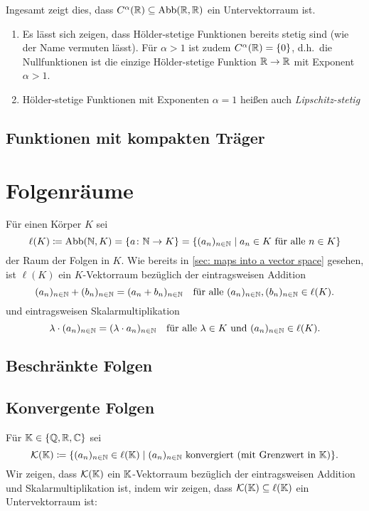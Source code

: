 Ingesamt zeigt dies, dass $C^\alpha(\mathbb{R}) \subseteq \mathrm{Abb}(\mathbb{R}, \mathbb{R})$ ein Untervektorraum ist.

\begin{bem}
 \begin{enumerate}[leftmargin=*]
  \item
   Es lässt sich zeigen, dass Hölder-stetige Funktionen bereits stetig sind (wie der Name vermuten lässt). Für $\alpha > 1$ ist zudem $C^\alpha(\mathbb{R}) = \{0\}$, d.h.\ die Nullfunktionen ist die einzige Hölder-stetige Funktion $\mathbb{R} \to \mathbb{R}$ mit Exponent $\alpha > 1$.
  \item
   Hölder-stetige Funktionen mit Exponenten $\alpha = 1$ heißen auch \emph{Lipschitz-stetig}
 \end{enumerate}
\end{bem}



\subsection{Funktionen mit kompakten Träger}





\section{Folgenräume}
Für einen Körper $K$ sei
\[
 \ell(K)
 \coloneqq \mathrm{Abb}(\mathbb{N}, K)
 = \{a \colon \mathbb{N} \to K\}
 = \{(a_n)_{n \in \mathbb{N}} \mid \text{$a_n \in K$ für alle $n \in K$}\}
\]
der Raum der Folgen in $K$. Wie bereits in \ref{sec: maps into a vector space} gesehen, ist $\ell(K)$ ein $K$-Vektorraum bezüglich der eintragsweisen Addition
\[
 (a_n)_{n \in \mathbb{N}} + (b_n)_{n \in \mathbb{N}} = (a_n + b_n)_{n \in \mathbb{N}}
 \quad
 \text{für alle $(a_n)_{n \in \mathbb{N}}, (b_n)_{n \in \mathbb{N}} \in \ell(K)$}.
\]
und eintragsweisen Skalarmultiplikation
\[
 \lambda \cdot (a_n)_{n \in \mathbb{N}}
 = (\lambda \cdot a_n)_{n \in \mathbb{N}}
 \quad
 \text{für alle $\lambda \in K$ und $(a_n)_{n \in \mathbb{N}} \in \ell(K)$}.
\]


\subsection{Beschränkte Folgen}


\subsection{Konvergente Folgen}
Für $\mathbb{K} \in \{\mathbb{Q}, \mathbb{R}, \mathbb{C}\}$  sei
\[
 \mathcal{K}(\mathbb{K})
 \coloneqq
 \{(a_n)_{n \in \mathbb{N}} \in \ell(\mathbb{K}) \mid \text{$(a_n)_{n \in \mathbb{N}}$ konvergiert (mit Grenzwert in $\mathbb{K}$)}\}.
\]
Wir zeigen, dass $\mathcal{K}(\mathbb{K})$ ein $\mathbb{K}$-Vektorraum bezüglich der eintragsweisen Addition und Skalarmultiplikation ist, indem wir zeigen, dass $\mathcal{K}(\mathbb{K}) \subseteq \ell(\mathbb{K})$ ein Untervektorraum ist:

